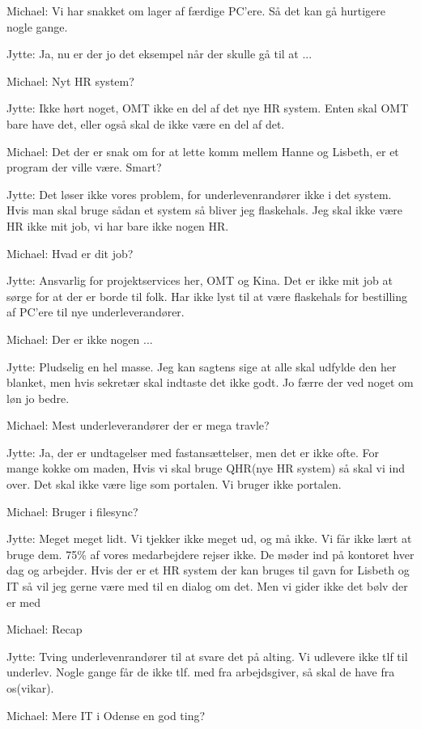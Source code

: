 \begin{linenumbers*}
Michael:
Vi har snakket om lager af færdige PC’ere. Så det kan gå hurtigere nogle gange.

Jytte:
Ja, nu er der jo det eksempel når der skulle gå til at ...

Michael:
Nyt HR system?

Jytte:
Ikke hørt noget, OMT ikke en del af det nye HR system.
Enten skal OMT bare have det, eller også skal de ikke være en del af det.

Michael:
Det der er snak om for at lette komm mellem Hanne og Lisbeth,
er et program der ville være. Smart?

Jytte:
Det løser ikke vores problem, for underlevenrandører ikke i det system.
Hvis man skal bruge sådan et system så bliver jeg flaskehals.
Jeg skal ikke være HR ikke mit job, vi har bare ikke nogen HR. 

Michael:
Hvad er dit job?

Jytte:
Ansvarlig for projektservices her, OMT og Kina.
Det er ikke mit job at sørge for at der er borde til folk.
Har ikke lyst til at være flaskehals for bestilling af PC’ere til nye underleverandører. 

Michael:
Der er ikke nogen ...

Jytte:
Pludselig en hel masse. Jeg kan sagtens sige at alle skal udfylde den her blanket,
men hvis sekretær skal indtaste det ikke godt. Jo færre der ved noget om løn jo bedre.

Michael:
Mest underleverandører der er mega travle?

Jytte:
Ja, der er undtagelser med fastansættelser, men det er ikke ofte.
For mange kokke om maden, 
Hvis vi skal bruge QHR(nye HR system) så skal vi ind over.
Det skal ikke være lige som portalen. Vi bruger ikke portalen.
 
Michael:
Bruger i filesync?

Jytte:
Meget meget lidt. Vi tjekker ikke meget ud, og må ikke.
Vi får ikke lært at bruge dem.
75\% af vores medarbejdere rejser ikke. De møder ind på kontoret hver dag og arbejder.
Hvis der er et HR system der kan bruges til gavn for Lisbeth og IT
så vil jeg gerne være med til en dialog om det. 
Men vi gider ikke det bølv der er med 

Michael:
Recap

Jytte:
Tving underlevenrandører til at svare det på alting.
Vi udlevere ikke tlf til underlev.
Nogle gange får de ikke tlf. med fra arbejdsgiver, så skal de have fra os(vikar).

Michael:
Mere IT i Odense en god ting?


\end{linenumbers*}

